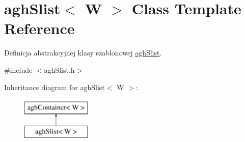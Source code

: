 \hypertarget{classaghSlist}{\section{agh\-Slist$<$ \-W $>$ \-Class \-Template \-Reference}
\label{classaghSlist}
}


\-Definicja abstrakcyjnej klasy szablonowej \hyperlink{classaghSlist}{agh\-Slist}.  




{\ttfamily \#include $<$agh\-Slist.\-h$>$}

\-Inheritance diagram for agh\-Slist$<$ \-W $>$\-:\begin{figure}[H]
\begin{center}
\leavevmode
\includegraphics[height=2.000000cm]{classaghSlist}
\end{center}
\end{figure}
